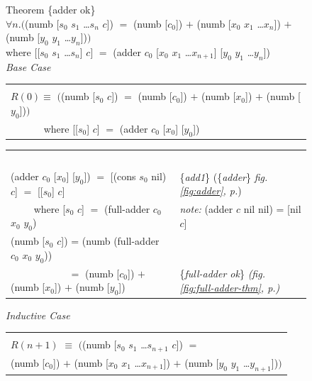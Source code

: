 \begin{figure}
Theorem \{adder ok\}\\
$\forall n.($\textsf{(numb [$s_0$ $s_1$ \dots $s_{n}$ $c$])} $=$
\textsf{(numb [$c_0$])} $+$ \textsf{(numb [$x_0$ $x_1$ \dots $x_{n}$])} $+$ \textsf{(numb [$y_0$ $y_1$ \dots $y_{n}$])}$)$\\
\hphantom{(numb}where \textsf{[[$s_0$ $s_1$ \dots $s_{n}$] $c$]} $=$ \textsf{(adder $c_0$ [$x_0$ $x_1$ \dots $x_{n+1}$] [$y_0$ $y_1$ \dots $y_{n}$])}
~\\[1mm]
\emph{Base Case}
\begin{center}
\begin{tabular}{l}
\hline\\[-1.0em]
$R(0) \equiv$  $($\textsf{(numb [$s_0$ $c$])} $=$ \textsf{(numb [$c_0$])} $+$ \textsf{(numb [$x_0$])} $+$ \textsf{(numb [$y_0$])}$)$ \\
 ~~~~~~ where \textsf{[[$s_0$] $c$]} $=$ \textsf{(adder $c_0$ [$x_0$] [$y_0$])}
\\[2pt]
\hline
\end{tabular}
\begin{tabular}{ll}~\\[-1.0em]
\textsf{(adder $c_0$ [$x_0$] [$y_0$])} $=$ \textsf{[(cons $s_0$ nil) $c$]} $=$ \textsf{[[$s_0$] $c$]} & \{\emph{add1}\} (\{\emph{adder}\} \emph{fig. \ref{fig:adder}, p.\pageref{fig:adder}}) \\
~~~~ where \textsf{[$s_0$ $c$]} $=$ \textsf{(full-adder $c_0$ $x_0$ $y_0$)}          & \emph{note:} (adder $c$ nil nil) = [nil $c$] \\
\textsf{(numb [$s_0$ $c$])} = \textsf{(numb (full-adder $c_0$ $x_0$ $y_0$))}          &  \\
~~~~~~~~~~~ $=$ \textsf{(numb [$c_0$])} $+$ \textsf{(numb [$x_0$])} $+$ \textsf{(numb [$y_0$])}  & \{\emph{full-adder ok}\} \emph{(fig. \ref{fig:full-adder-thm}, p.\pageref{fig:full-adder-thm})}\\
\end{tabular}
\end{center}
\emph{Inductive Case}
\begin{center}
\begin{tabular}{l}
\hline\\[-1.0em]
$R(n+1)$ $\equiv$ $($\textsf{(numb [$s_0$ $s_1$ \dots $s_{n+1}$ $c$])} $=$ \\
\hphantom{$R(n+1)$ $\equiv$ $($}\textsf{(numb [$c_0$])} $+$ \textsf{(numb [$x_0$ $x_1$ \dots $x_{n+1}$])} $+$ \textsf{(numb [$y_0$ $y_1$ \dots $y_{n+1}$])}$)$ \\

\end{tabular}
\end{center}
\end{figure}
